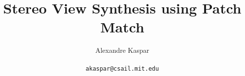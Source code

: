 \documentclass[10pt,twocolumn,letterpaper]{article}
\begin{document}
\title{Stereo View Synthesis using Patch Match}

\author{Alexandre Kaspar\\
\\
{\tt\small akaspar@csail.mit.edu}
}

\maketitle











{\small


}
\end{document}
